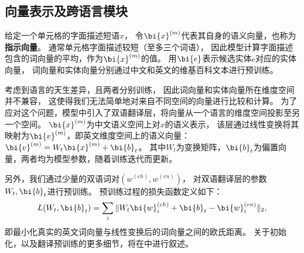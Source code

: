 
\subsection{向量表示及跨语言模块}
\label{sec:tabel-translation}

给定一个单元格的字面描述短语$x$，
令$\bi{x}^{(m)}$代表其自身的语义向量，也称为\textbf{指示向量}。
通常单元格字面描述较短（至多三个词语），
因此模型计算字面描述包含的词向量的平均，作为$\bi{x}^{(m)}$的值。
用$\bi{e}$表示候选实体$e$对应的实体向量，
词向量和实体向量分别通过中文和英文的维基百科文本进行预训练。

考虑到语言的天生差异，且两者分别训练，
因此词向量和实体向量所在维度空间并不兼容，
这使得我们无法简单地对来自不同空间的向量进行比较和计算。
为了应对这个问题，模型中引入了双语翻译层，将向量从一个语言的维度空间投影至另一个空间。
$\bi{x}^{(m)}$为中文语义空间上对$x$的语义表示，
该层通过线性变换将其映射为$\bi{v}^{(m)}$，即英文维度空间上的语义向量：
$\bi{v}^{(m)}=W_t \bi{x}^{(m)} + \bi{b}_t$。
其中$W_t$为变换矩阵，$\bi{b}_t$为偏置向量，两者均为模型参数，随着训练迭代而更新。

另外，我们通过少量的双语词对$(w^{(ch)}, w^{(en)})$，
对双语翻译层的参数$W_t, \bi{b}_t$进行预训练。
预训练过程的损失函数定义如下：
\begin{equation}
\label{eqn:translation}
L(W_{t}, \bi{b}_{t}) = \sum_i \Arrowvert W_{t} \bi{w}_i^{(ch)} + \bi{b}_{t} - \bi{w}_i^{(en)} \Arrowvert_2,
\end{equation}
即最小化真实的英文词向量与线性变换后的词向量之间的欧氏距离。
关于初始化，以及翻译预训练的更多细节，将在中进行叙述。


